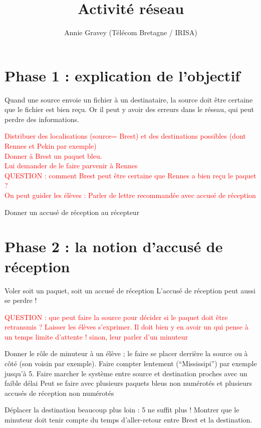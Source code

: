 \documentclass[10pt,a4paper]{article}
\title{Activité réseau}
\author{Annie Gravey (Télécom Bretagne / IRISA)}
\date{}
\begin{document}
\maketitle
\thispagestyle{empty}

\section{Phase 1 : explication de l'objectif}

Quand une source envoie un fichier à un destinataire, la source doit être certaine que le fichier est bien reçu. Or il peut y avoir des erreurs dans le réseau, qui peut perdre des informations.

\textcolor{red}{Distribuer des localisations (source= Brest) et des
  destinations possibles (dont Rennes et Pekin par exemple)\\
  Donner à Brest un paquet bleu.\\
  Lui demander de le faire parvenir à Rennes\\
  QUESTION : comment Brest peut être certaine que Rennes a bien reçu le paquet ?\\ 
  On peut guider les élèves : Parler de lettre recommandée avec accusé de réception}

Donner un accusé de réception au récepteur


\section{Phase 2 : la notion d'accusé de réception}

Voler soit un paquet, soit un accusé de réception
L’accusé de réception peut aussi se perdre !

\textcolor{red}{QUESTION : que peut faire la source pour décider si le paquet
doit être retransmis ? Laisser les élèves s’exprimer. Il doit bien y en avoir
un qui pense à un temps limite d’attente ! sinon, leur parler d’un minuteur}

Donner le rôle de minuteur à un élève ; le faire se placer derrière la source
ou à côté (son voisin par exemple). Faire compter lentement (``Mississipi'') par
exemple jusqu’à 5. Faire marcher le système entre source et destination proches
avec un faible délai Peut se faire avec plusieurs paquets bleus non numérotés
et plusieurs accusés de réception non numérotés

Déplacer la destination beaucoup plus loin : 5 ne suffit plus !  Montrer que le
minuteur doit tenir compte du temps d’aller-retour entre Brest et la
destination.
\end{document}
